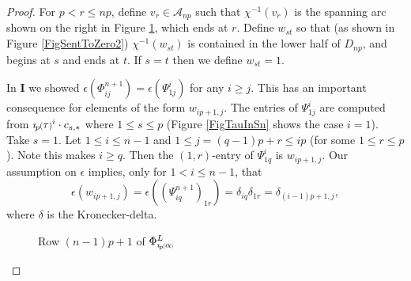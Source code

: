 \documentclass[11pt]{amsart}
\def\A{{\mathcal A}}
\newcommand*{\smallp}[1]{\scalebox{.75}{\ensuremath#1}}
\newcommand*{\subsmallp}[1]{\scalebox{.5}{\ensuremath#1}}
\newcommand{\pp}[2][p]{\imath_{\hspace*{-1pt}#1}\hspace*{-.5pt}\smallp(#2\smallp)}
\newcommand{\subpp}[2][p]{\imath_{\hspace*{-1pt}#1}\hspace*{-.5pt}\subsmallp(#2\subsmallp)}
\theoremstyle{definition}
\begin{document}
\begin{proof}
For $p< r \le np$, define $v_r\in\A_{np}$ such that $\chi^{-1}(v_r)$ is the spanning arc shown on the right in Figure \ref{FigPhiLCalcPhi}, which ends at $r$. Define $w_{st}$ so that (as shown in Figure \ref{FigSentToZero2}) $\chi^{-1}(w_{st})$ is contained in the lower half of $D_{np}$, and begins at $s$ and ends at $t$. If $s=t$ then we define $w_{st}=1$.

In {\bf I} we showed $\epsilon(\Phi_{ij}^{n+1}) = \epsilon(\Psi_{1j}^i)$ for any $i\ge j$. This has an important consequence for elements of the form $w_{ip+1,j}$. The entries of $\Psi_{1j}^i$ are computed from $\pp\tau^i\cdot c_{s,\ast}$ where $1\le s\le p$ (Figure \ref{FigTauInSn} shows the case $i=1$). Take $s=1$. Let $1\le i\le n-1$ and $1\le j=(q-1)p+r\le ip$ (for some $1\le r\le p$). Note this makes $i\ge q$. Then the $(1,r)$-entry of $\Psi_{1q}^i$ is $w_{ip+1,j}$. Our assumption on $\epsilon$ implies, only for $1<i\le n-1$, that
    \begin{equation}
    \epsilon(w_{ip+1,j})=\epsilon((\Psi_{iq}^{n+1})_{1r}) = \delta_{iq}\delta_{1r} = \delta_{(i-1)p+1,j},
    \label{EqnMod1Ws}
    \end{equation}
where $\delta$ is the Kronecker-delta. 

    \begin{figure}[ht]
      \caption{Row $(n-1)p+1$ of $\Phi_{\subpp\alpha}^L$}
      \label{FigPhiLCalcPhi}
    \end{figure}


\end{proof}
\end{document}
